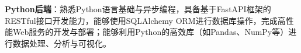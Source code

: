 \item \textbf{Python后端}：熟悉Python语言基础与异步编程，具备基于FastAPI框架的RESTful接口开发能力，能够使用SQLAlchemy ORM进行数据库操作，完成高性能Web服务的开发与部署；能够利用Python的高效库（如Pandas、NumPy等）进行数据处理、分析与可视化。